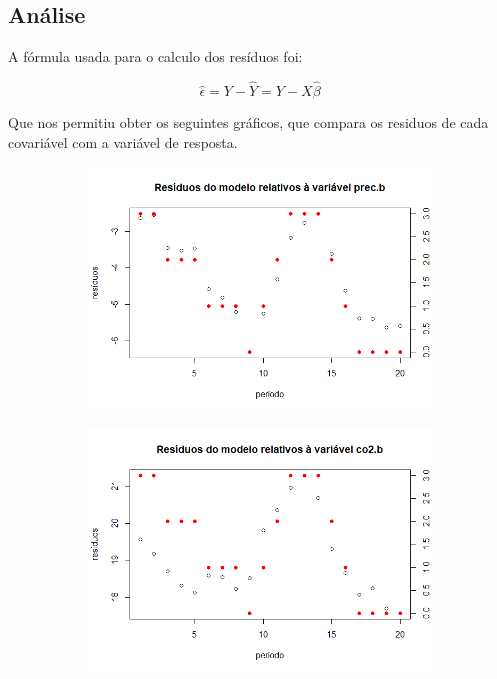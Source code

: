 \documentclass{article}
\begin{document}
\newpage			
			
			\subsection*{Análise}
			
			A fórmula usada para o calculo dos resíduos foi:
			
			\begin{equation*}
				\hat{\epsilon} = Y - \hat{Y} = Y - X\hat{\beta}
			\end{equation*}
			
			\noindent Que nos permitiu obter os seguintes gráficos, que compara os residuos de cada covariável com a variável de resposta.
			
				\begin{figure}[!h]
 					 \begin{subfigure}[b]{0.6\textwidth}
   						 \includegraphics[width=\textwidth]{residuosPrec}
 					 \end{subfigure}
 					 \begin{subfigure}[b]{0.6\textwidth}
   						 \includegraphics[width=\textwidth]{residuosCO2}

\end{subfigure}
\end{figure}
\end{document}
